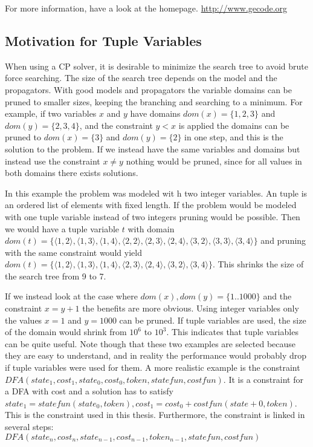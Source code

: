 \documentclass[a4paper,11pt]{article}
\begin{document}
For more information, have a look at the homepage. \url{http://www.gecode.org}

\subsection{Motivation for Tuple Variables}
When using a CP solver, it is desirable to minimize the search tree to avoid brute force searching. The size of the search tree depends on the model and the propagators. With good models and propagators the variable domains can be pruned to smaller sizes, keeping the branching and searching to a minimum. For example, if two variables $x$ and $y$ have domains $dom(x)=\{1,2,3\}$ and $dom(y)=\{2,3,4\}$, and the constraint $y<x$ is applied the domains can be pruned to $dom(x)=\{3\}$ and $dom(y)=\{2\}$ in one step, and this is the solution to the problem. If we instead have the same variables and domains but instead use the constraint $x\neq y$ nothing would be pruned, since for all values in both domains there exists solutions. 

In this example the problem was modeled wit h two integer variables. An tuple is an ordered list of elements with fixed length. If the problem would be modeled with one tuple variable instead of two integers pruning would be possible. Then we would have a tuple variable $t$ with domain $dom(t)=\{\langle1,2\rangle,\langle1,3\rangle,\langle1,4\rangle,\langle2,2\rangle,\langle2,3\rangle,\langle2,4\rangle,\langle3,2\rangle,\langle3,3\rangle,\langle3,4\rangle\}$ and pruning with the same constraint would yield $dom(t)=\{\langle1,2\rangle,\langle1,3\rangle,\langle1,4\rangle,\langle2,3\rangle,\langle2,4\rangle,\langle3,2\rangle,\langle3,4\rangle\}$. This shrinks the size of the search tree from 9 to 7. 

If we instead look at the case where $dom(x),dom(y)=\{1..1000\}$ and the constraint $x=y+1$ the benefits are more obvious. Using integer variables only the values $x=1$ and $y=1000$ can be pruned. If tuple variables are used, the size of the domain would shrink from $10^6$ to $10^3$. This indicates that tuple variables can be quite useful. Note though that these two examples are selected because they are easy to understand, and in reality the performance would probably drop if tuple variables were used for them. A more realistic example is the constraint $DFA(state_1, cost_1, state_0, cost_0, token, statefun, costfun)$. It is a constraint for a DFA with cost and a solution has to satisfy $state_1= statefun(state_0, token), cost_1=cost_0+costfun(state+0, token)$. This is the constraint used in this thesis. Furthermore, the constraint is linked in several steps: $DFA(state_n, cost_n, state_{n-1}, cost_{n-1}, token_{n-1}, statefun, costfun)$
\end{document}
